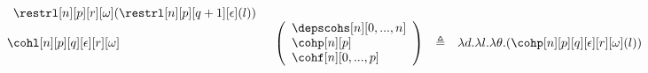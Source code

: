 \documentclass{msc}
\newcommand{\defeq}{\ensuremath{\triangleq}}
\begin{document}
\begin{equation*}
\begin{array}{llcl}
\begin{array}{l}
      \restrl[n][p][r][\omega](\restrl[n][p][q+1][\epsilon](l))
    \end{array}                                                                  \\
    \cohl[n][p][q][\epsilon][r][\omega]                &
    \left(\begin{array}{l}
              \depscohs[n][0,...,n] \\
              \cohp[n][p]           \\
              \cohf[n][0,...,p]     \\
            \end{array}\right)                           & \defeq &
    \lambda d. \lambda l. \lambda \theta. (\cohp[n][p][q][\epsilon][r][\omega](l))                                                                    \\
  \end{array}
\end{equation*}



\end{document}
